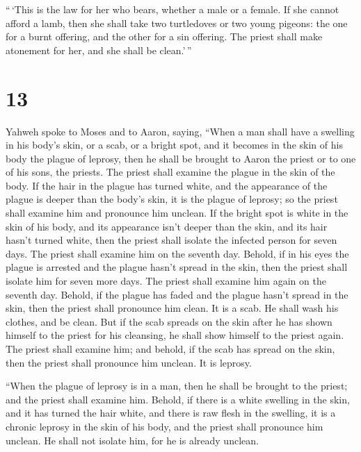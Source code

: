 ``\,`This is the law for her who bears, whether a male or a female.
 If she cannot afford a lamb, then she shall take two
turtledoves or two young pigeons: the one for a burnt offering, and the
other for a sin offering. The priest shall make atonement for her, and
she shall be clean.'\,''

\hypertarget{section-12}{%
\section{13}\label{section-12}}

 Yahweh spoke to Moses and to Aaron, saying, 
``When a man shall have a swelling in his body's skin, or a scab, or a
bright spot, and it becomes in the skin of his body the plague of
leprosy, then he shall be brought to Aaron the priest or to one of his
sons, the priests.  The priest shall examine the plague in
the skin of the body. If the hair in the plague has turned white, and
the appearance of the plague is deeper than the body's skin, it is the
plague of leprosy; so the priest shall examine him and pronounce him
unclean.  If the bright spot is white in the skin of his
body, and its appearance isn't deeper than the skin, and its hair hasn't
turned white, then the priest shall isolate the infected person for
seven days.  The priest shall examine him on the seventh
day. Behold, if in his eyes the plague is arrested and the plague hasn't
spread in the skin, then the priest shall isolate him for seven more
days.  The priest shall examine him again on the seventh
day. Behold, if the plague has faded and the plague hasn't spread in the
skin, then the priest shall pronounce him clean. It is a scab. He shall
wash his clothes, and be clean.  But if the scab spreads on
the skin after he has shown himself to the priest for his cleansing, he
shall show himself to the priest again.  The priest shall
examine him; and behold, if the scab has spread on the skin, then the
priest shall pronounce him unclean. It is leprosy.

 ``When the plague of leprosy is in a man, then he shall be
brought to the priest;  and the priest shall examine him.
Behold, if there is a white swelling in the skin, and it has turned the
hair white, and there is raw flesh in the swelling,  it is
a chronic leprosy in the skin of his body, and the priest shall
pronounce him unclean. He shall not isolate him, for he is already
unclean.

